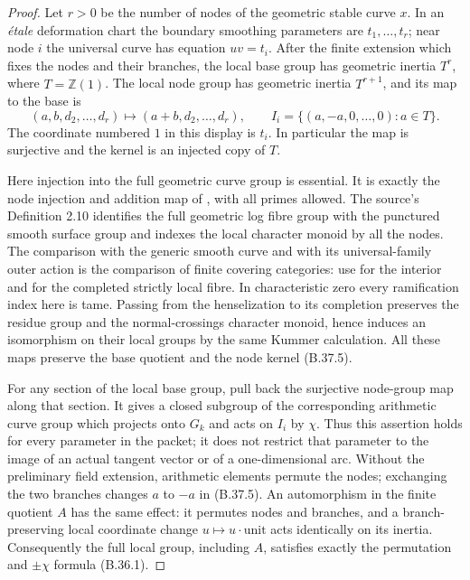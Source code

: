 \documentclass[11pt,oneside]{article}
\begin{document}
\begin{proof}
Let $r>0$ be the number of nodes of the geometric stable
curve $x$. In an \emph{\'etale} deformation chart the
boundary smoothing parameters are $t_1,\ldots,t_r$;
near node $i$ the universal curve has equation
$uv=t_i$. After the finite extension which fixes the
nodes and their branches, the local base group has
geometric inertia
$T^r$, where $T=\widehat{\mathbb Z}(1)$.
The local node group has geometric inertia
$T^{r+1}$, and its map to the base is
\[
 (a,b,d_2,\ldots,d_r)
        \longmapsto (a+b,d_2,\ldots,d_r),
 \qquad
 I_i=\{(a,-a,0,\ldots,0):a\in T\}.
 \tag{B.37.5}
\]
The coordinate numbered $1$ in this display is $t_i$.
In particular the map is surjective and the kernel
is an injected copy of $T$.

Here injection into the full geometric curve group is
essential. It is exactly the node injection and addition
map of \cite[Lemma 2.11(ii)--(iii)]{F-HoshiMochizukiNodes},
with all primes allowed. The source's Definition 2.10
identifies the full geometric log fibre group with the
punctured smooth surface group and indexes the local
character monoid by all the nodes. The comparison with
the generic smooth curve and with its universal-family
outer action is the comparison of finite covering
categories: use \cite[Theorem 7.6]{F-Illusie} for the
interior and \cite[Corollary 3.9]{F-HoshiLog} for the
completed strictly local fibre. In characteristic zero
every ramification index here is tame. Passing from the
henselization to its completion preserves the residue
group and the normal-crossings character monoid, hence
induces an isomorphism on their local groups by the same
Kummer calculation. All these maps preserve the base
quotient and the node kernel (B.37.5).

For any section of the local base group, pull back the
surjective node-group map along that section. It gives
a closed subgroup of the corresponding arithmetic
curve group which projects onto $G_k$ and acts on
$I_i$ by $\chi$. Thus this assertion holds for every
parameter in the packet; it does not restrict that
parameter to the image of an actual tangent vector
or of a one-dimensional arc. Without the preliminary
field extension, arithmetic elements permute the nodes;
exchanging the two branches changes $a$ to $-a$ in
(B.37.5). An automorphism in the finite quotient $A$
has the same effect: it permutes nodes and branches,
and a branch-preserving local coordinate change
$u\mapsto u\cdot\text{unit}$ acts identically on its
inertia. Consequently the full local group, including
$A$, satisfies exactly the permutation and $\pm\chi$
formula (B.36.1).


\end{proof}
\end{document}

